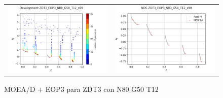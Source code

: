 \begin{figure}[H]
\begin{tabular}{c c}
    \includegraphics[scale=0.5]{figures/ZDT3_EOP3_N80_G50_T12/s99_dev.png} &
    \includegraphics[scale=0.5]{figures/ZDT3_EOP3_N80_G50_T12/s99_nds.png}\\
    \end{tabular}
    \caption{MOEA/D + EOP3 para ZDT3 con N80 G50 T12 }
    \label{fig:14}
\end{figure}

